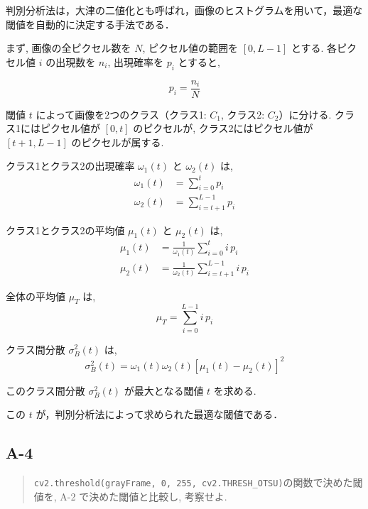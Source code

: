 \documentclass[fleqn, a4paper. 12pt]{jsarticle}
\begin{document}
      判別分析法は，大津の二値化とも呼ばれ，画像のヒストグラムを用いて，最適な閾値を自動的に決定する手法である．

      \quad

      まず, 画像の全ピクセル数を $N$, ピクセル値の範囲を $[0, L-1]$ とする. 各ピクセル値 $i$ の出現数を $n_i$, 出現確率を $p_i$ とすると,
      
      \begin{equation}
      p_i = \frac{n_i}{N}
      \end{equation}

      閾値 $t$ によって画像を2つのクラス（クラス1: $C_1$, クラス2: $C_2$）に分ける. クラス1にはピクセル値が $[0, t]$ のピクセルが, クラス2にはピクセル値が $[t+1, L-1]$ のピクセルが属する.

      クラス1とクラス2の出現確率 $\omega_1(t)$ と $\omega_2(t)$ は,
      \begin{align}
      \omega_1(t) &= \sum_{i=0}^{t} p_i \\
      \omega_2(t) &= \sum_{i=t+1}^{L-1} p_i
      \end{align}

      クラス1とクラス2の平均値 $\mu_1(t)$ と $\mu_2(t)$ は,
      \begin{align}
      \mu_1(t) &= \frac{1}{\omega_1(t)} \sum_{i=0}^{t} i \, p_i \\
      \mu_2(t) &= \frac{1}{\omega_2(t)} \sum_{i=t+1}^{L-1} i \, p_i
      \end{align}

      全体の平均値 $\mu_T$ は,
      \begin{equation}
      \mu_T = \sum_{i=0}^{L-1} i \, p_i
      \end{equation}

      クラス間分散 $\sigma_B^2(t)$ は,
      \begin{equation}
      \sigma_B^2(t) = \omega_1(t) \omega_2(t) [\mu_1(t) - \mu_2(t)]^2
      \end{equation}

      このクラス間分散 $\sigma_B^2(t)$ が最大となる閾値 $t$ を求める.

      この $t$ が，判別分析法によって求められた最適な閾値である．

    \subsection*{A-4}
      
      \begin{quote}
        \texttt{cv2.threshold(grayFrame, 0, 255, cv2.THRESH\_OTSU)}の関数で決めた閾値を, A-2 で決めた閾値と比較し, 考察せよ.
      \end{quote}
\end{document}
